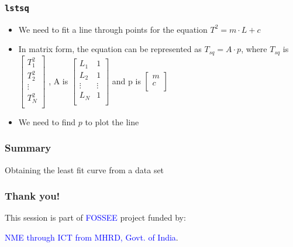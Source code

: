 \documentclass[14pt,compress]{beamer}
\newcommand{\typ}[1]{\lstinline{#1}}
\begin{document}
\begin{frame}[fragile]
  \frametitle{\typ{lstsq}}
  \begin{itemize}
  \item We need to fit a line through points for the equation $T^2 = m \cdot L+c$
  \item In matrix form, the equation can be represented as $T_{sq} = A \cdot p$, where $T_{sq}$ is
  $\begin{bmatrix}
  T^2_1 \\
  T^2_2 \\
  \vdots\\
  T^2_N \\
  \end{bmatrix}$
, A is   
  $\begin{bmatrix}
  L_1 & 1 \\
  L_2 & 1 \\
  \vdots & \vdots\\
  L_N & 1 \\
  \end{bmatrix}$
  and p is 
  $\begin{bmatrix}
  m\\
  c\\
  \end{bmatrix}$
  \item We need to find $p$ to plot the line
  \end{itemize}
\end{frame}

\begin{frame}[fragile]
  \frametitle{Summary}
    Obtaining the least fit curve from a data set
\end{frame}

\begin{frame}
  \frametitle{Thank you!}  
  \begin{block}{}
  This session is part of \textcolor{blue}{FOSSEE} project funded by:
  \begin{center}
    \textcolor{blue}{NME through ICT from MHRD, Govt. of India}.
  \end{center}  
  \end{block}
\end{frame}
\end{document}
